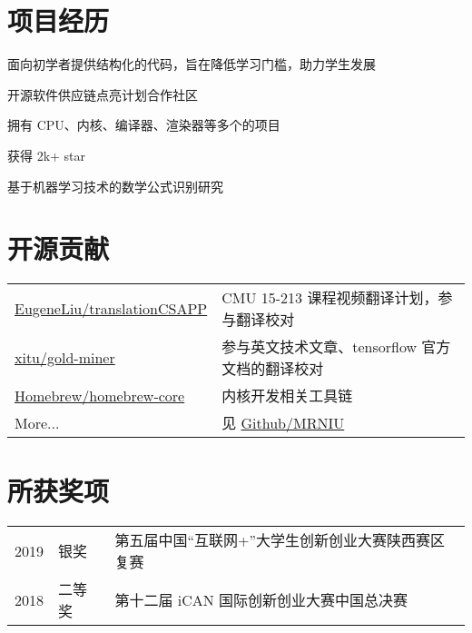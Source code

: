 \documentclass[]{deedy-resume-openfont}
\begin{document}
\begin{minipage}[t]{0.73\textwidth}

\section{项目经历}
\begin{tightemize}
    \item 面向初学者提供结构化的代码，旨在降低学习门槛，助力学生发展
    \item 开源软件供应链点亮计划合作社区
    \item 拥有 CPU、内核、编译器、渲染器等多个的项目
    \item 获得 2k+ star
    \end{tightemize}
\sectionsep

\begin{tightemize}
    \item 基于机器学习技术的数学公式识别研究
    \end{tightemize}
\sectionsep


\section{开源贡献}
\begin{tabular}{ll}
    \href{https://github.com/EugeneLiu/translationCSAPP}{EugeneLiu/translationCSAPP} & CMU 15-213 课程视频翻译计划，参与翻译校对 \\
    \href{https://github.com/xitu/gold-miner}{xitu/gold-miner} & 参与英文技术文章、tensorflow 官方文档的翻译校对 \\
    \href{https://github.com/Homebrew/homebrew-core}{Homebrew/homebrew-core} & 内核开发相关工具链 \\
    More... & 见 \href{https://github.com/MRNIU}{Github/MRNIU}
\end{tabular}
\sectionsep


\section{所获奖项} 
\begin{tabular}{rll}
    2019         & 银奖    & 第五届中国“互联网+”大学生创新创业大赛陕西赛区复赛 \\
    2018	     & 二等奖  & 第十二届 iCAN 国际创新创业大赛中国总决赛 \\
\end{tabular}
\sectionsep


\end{minipage}
\end{document}

